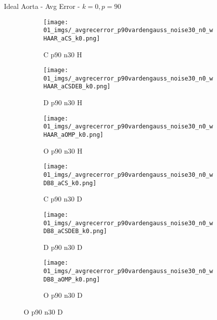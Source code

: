 \begin{frame}{Ideal Aorta - Avg Error - $k=0,p=90$}{}
\begin{figure}
\begin{subfigure}{0.13\textwidth}
\texttt{[image: 01\_imgs/\_avgrecerror\_p90vardengauss\_noise30\_n0\_wHAAR\_aCS\_k0.png]}
\caption*{\tiny C p90 n30 H}
\end{subfigure}
\begin{subfigure}{0.13\textwidth}
\texttt{[image: 01\_imgs/\_avgrecerror\_p90vardengauss\_noise30\_n0\_wHAAR\_aCSDEB\_k0.png]}
\caption*{\tiny D p90 n30 H}
\end{subfigure}
\begin{subfigure}{0.13\textwidth}
\texttt{[image: 01\_imgs/\_avgrecerror\_p90vardengauss\_noise30\_n0\_wHAAR\_aOMP\_k0.png]}
\caption*{\tiny O p90 n30 H}
\end{subfigure}
\begin{subfigure}{0.13\textwidth}
\texttt{[image: 01\_imgs/\_avgrecerror\_p90vardengauss\_noise30\_n0\_wDB8\_aCS\_k0.png]}
\caption*{\tiny C p90 n30 D}
\end{subfigure}
\begin{subfigure}{0.13\textwidth}
\texttt{[image: 01\_imgs/\_avgrecerror\_p90vardengauss\_noise30\_n0\_wDB8\_aCSDEB\_k0.png]}
\caption*{\tiny D p90 n30 D}
\end{subfigure}
\begin{subfigure}{0.13\textwidth}
\texttt{[image: 01\_imgs/\_avgrecerror\_p90vardengauss\_noise30\_n0\_wDB8\_aOMP\_k0.png]}
\caption*{\tiny O p90 n30 D}
\end{subfigure}
\end{figure}
\end{frame}


